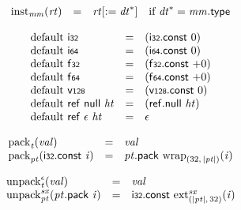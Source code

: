 \vspace{1ex}

$$
\begin{array}{@{}lcl@{}l@{}}
{{\mathrm{inst}}}_{{\mathit{mm}}}({\mathit{rt}}) &=& {{\mathit{rt}}}{{}[{ := }\;{{\mathit{dt}}^\ast}]} &\quad
  \mbox{if}~{{\mathit{dt}}^\ast} = {\mathit{mm}}.\mathsf{type} \\
\end{array}
$$

\vspace{1ex}

\vspace{1ex}

$$
\begin{array}{@{}lcl@{}l@{}}
{\mathrm{default}}~\mathsf{i{\scriptstyle32}} &=& (\mathsf{i{\scriptstyle32}}.\mathsf{const}~0) &  \\
{\mathrm{default}}~\mathsf{i{\scriptstyle64}} &=& (\mathsf{i{\scriptstyle64}}.\mathsf{const}~0) &  \\
{\mathrm{default}}~\mathsf{f{\scriptstyle32}} &=& (\mathsf{f{\scriptstyle32}}.\mathsf{const}~{+0}) &  \\
{\mathrm{default}}~\mathsf{f{\scriptstyle64}} &=& (\mathsf{f{\scriptstyle64}}.\mathsf{const}~{+0}) &  \\
{\mathrm{default}}~\mathsf{v{\scriptstyle128}} &=& (\mathsf{v{\scriptstyle128}}.\mathsf{const}~0) &  \\
{\mathrm{default}}~\mathsf{ref}~\mathsf{null}~{\mathit{ht}} &=& (\mathsf{ref.null}~{\mathit{ht}}) &  \\
{\mathrm{default}}~\mathsf{ref}~\epsilon~{\mathit{ht}} &=& \epsilon &  \\
\end{array}
$$

\vspace{1ex}

$$
\begin{array}{@{}lcl@{}l@{}}
{{\mathrm{pack}}}_{{\mathit{t}}}({\mathit{val}}) &=& {\mathit{val}} &  \\
{{\mathrm{pack}}}_{{\mathit{pt}}}(\mathsf{i{\scriptstyle32}}.\mathsf{const}~{\mathit{i}}) &=& {\mathit{pt}}.\mathsf{pack}~{{{\mathrm{wrap}}}_{(32,\, {|{\mathit{pt}}|})}}{({\mathit{i}})} &  \\
\end{array}
$$

$$
\begin{array}{@{}lcl@{}l@{}}
{{{{\mathrm{unpack}}}_{{\mathit{t}}}^{\epsilon}}}{({\mathit{val}})} &=& {\mathit{val}} &  \\
{{{{\mathrm{unpack}}}_{{\mathit{pt}}}^{{\mathit{sx}}}}}{({\mathit{pt}}.\mathsf{pack}~{\mathit{i}})} &=& \mathsf{i{\scriptstyle32}}.\mathsf{const}~{{{{\mathrm{ext}}}_{({|{\mathit{pt}}|},\, 32)}^{{\mathit{sx}}}}}{({\mathit{i}})} &  \\
\end{array}
$$

